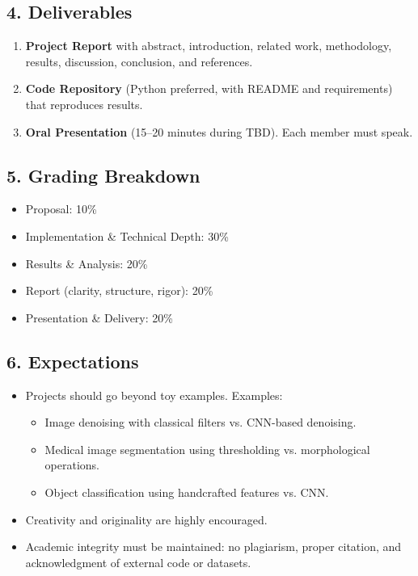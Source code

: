 \documentclass[a4paper,10pt]{article}
\begin{document}
\subsection*{4. Deliverables}
\begin{enumerate}
    \item \textbf{Project Report} with abstract, introduction, related work, methodology, results, discussion, conclusion, and references.
    \item \textbf{Code Repository} (Python preferred, with README and requirements) that reproduces results.
    \item \textbf{Oral Presentation} (15--20 minutes during TBD). Each member must speak.
\end{enumerate}

\subsection*{5. Grading Breakdown}
\begin{itemize}
    \item Proposal: 10\%
    \item Implementation \& Technical Depth: 30\%
    \item Results \& Analysis: 20\%
    \item Report (clarity, structure, rigor): 20\%
    \item Presentation \& Delivery: 20\%
\end{itemize}

\subsection*{6. Expectations}
\begin{itemize}
    \item Projects should go beyond toy examples. Examples:
    \begin{itemize}
        \item Image denoising with classical filters vs. CNN-based denoising.
        \item Medical image segmentation using thresholding vs. morphological operations.
        \item Object classification using handcrafted features vs. CNN.
    \end{itemize}
    \item Creativity and originality are highly encouraged.
    \item Academic integrity must be maintained: no plagiarism, proper citation, and acknowledgment of external code or datasets.
\end{itemize}
\end{document}
